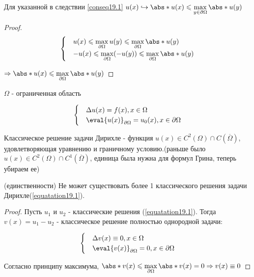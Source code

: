 \begin{conseq}
Для указанной в следствии \ref{conseq19.1} $u(x) \hookrightarrow \abs*{u(x)} \leq \max\limits_{y \in \partial \Omega} \abs*{u(y)}$
\begin{proof}

\begin{equation}
  \begin{cases}
  & u(x) \leq \max\limits_{\partial \Omega}u(y) \leq \max\limits_{\partial \Omega}\abs*{u(y)}\\  
  &-u(x) \leq \max\limits_{\partial \Omega}(-u(y)) \leq \max\limits_{\partial \Omega}\abs*{u(y)}\\
  \end{cases}
  \end{equation}  
  
  $\Rightarrow \abs*{u(x)} \leq \max\limits_{\partial \Omega}\abs*{u(y)}$
\end{proof}
\end{conseq}


$\Omega$ - ограниченная область 

\begin{equation}
  \begin{cases}\label{equatation19.1}
  & \Delta u(x) = f(x), x \in \Omega\\ 
  & \eval{u(x)}_{\partial \Omega} = u_0(x), x \in \partial \Omega\\
  \end{cases}
\end{equation} 
  
 \begin{definition}
 Классическое решение задачи Дирихле - функция
  $u(x) \in C^2(\Omega) \cap C(\overline{\Omega})$,
  удовлетворяющая уравнению и граничному условию.(раньше было $u(x) \in C^2(\Omega) \cap C^{\boxed{1}}(\overline{\Omega})$, единица была нужна для формул Грина, теперь убираем ее)
 \end{definition}
 \begin{theorem}
 (единственности) Не может существовать более 1 классического решения задачи Дирихле(\ref{equatation19.1}).
 
 \begin{proof}
 Пусть $u_1$ и $u_2$ - классические решения (\ref{equatation19.1}). Тогда $v(x) = u_1 - u_2$ - классическое решение полностью однородной задачи:
 
 \begin{equation}
  \begin{cases}\label{equatation19.2}
  & \Delta v(x) \equiv 0, x \in \Omega\\ 
  & \eval{v(x)}_{\partial \Omega} = 0, x \in \partial \Omega\\
  \end{cases}
\end{equation}
 
 Согласно принципу максимума, $\abs*{v(x)} \leq \max\limits_{\partial\Omega} \abs*{v(x)} = 0 \Rightarrow v(x) \equiv 0$
 \end{proof}
 \end{theorem}